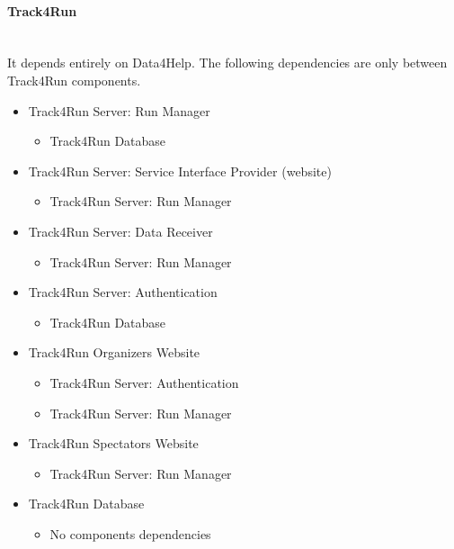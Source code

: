 \documentclass[../DD.tex]{subfiles}
\begin{document}
\paragraph{Track4Run}\mbox{}\\
It depends entirely on Data4Help. The following dependencies are only between Track4Run components.
\begin{itemize}
	\item{Track4Run Server: Run Manager}
	\begin{itemize}\item{Track4Run Database}\end{itemize}
	\item{Track4Run Server: Service Interface Provider (website)}
	\begin{itemize}\item{Track4Run Server: Run Manager}\end{itemize}
	\item{Track4Run Server: Data Receiver}
	\begin{itemize}\item{Track4Run Server: Run Manager}\end{itemize}
	\item{Track4Run Server: Authentication}
	\begin{itemize}\item{Track4Run Database}\end{itemize}
	\item{Track4Run Organizers Website}
	\begin{itemize}\item{Track4Run Server: Authentication}\item{Track4Run Server: Run Manager}\end{itemize}
	\item{Track4Run Spectators Website}
	\begin{itemize}\item{Track4Run Server: Run Manager}\end{itemize}
	\item{Track4Run Database}
	\begin{itemize}\item{No components dependencies}\end{itemize}
\end{itemize}
\end{document}
